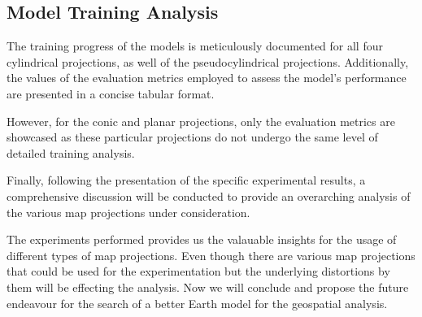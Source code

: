 \subsection{Model Training Analysis}
The training progress of the models is meticulously documented for all four cylindrical projections, as well of the pseudocylindrical projections.
Additionally, the values of the evaluation metrics employed to assess the model's performance are presented in a concise tabular format.

However, for the conic and planar projections, only the evaluation metrics are showcased as these particular projections do not undergo the same level of detailed training
analysis.

Finally, following the presentation of the specific experimental results, a comprehensive discussion will be conducted to provide an overarching analysis of the
various map projections under consideration.

\clearpage

\clearpage

\clearpage


\clearpage



The experiments performed provides us the valauable insights for the usage of different types of map projections. Even though there are various map projections that could be used for the experimentation but the underlying
distortions by them will be effecting the analysis. Now we will conclude and propose the future endeavour for the search of a better Earth model for the geospatial analysis.